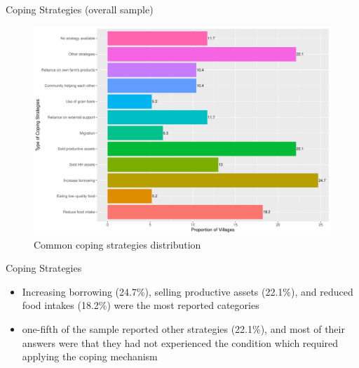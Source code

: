 \documentclass[
  ignorenonframetext,
]{beamer}
\providecommand{\tightlist}{%
  \setlength{\itemsep}{0pt}\setlength{\parskip}{0pt}}
\begin{document}
\begin{frame}{Coping Strategies (overall sample)}
\protect\hypertarget{vthccsi}{}
\begin{figure}
\includegraphics[width=1\linewidth]{example_plots_files/figure-beamer/unnamed-chunk-12-1} \caption{Common coping strategies distribution}\label{fig:unnamed-chunk-12}
\end{figure}
\end{frame}

\begin{frame}{Coping Strategies}
\protect\hypertarget{coping-strategies}{}
\begin{itemize}
\tightlist
\item
  Increasing borrowing (24.7\%), selling productive assets (22.1\%), and
  reduced food intakes (18.2\%) were the most reported categories\\
\item
  one-fifth of the sample reported other strategies (22.1\%), and most
  of their answers were that they had not experienced the condition
  which required applying the coping mechanism
\end{itemize}
\end{frame}
\end{document}
